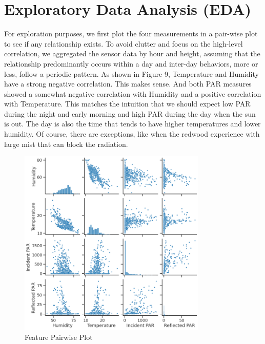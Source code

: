 \documentclass[11pt, letterpaper]{article}
\begin{document}
\section{Exploratory Data Analysis (EDA)}
For exploration purposes, we first plot the four measurements in a pair-wise plot to see if any relationship exists. To avoid clutter and focus on the high-level correlation, we aggregated the sensor data by hour and height, assuming that the relationship predominantly occurs within a day and inter-day behaviors, more or less, follow a periodic pattern. As shown in Figure 9, Temperature and Humidity have a strong negative correlation. This makes sense. And both PAR measures showed a somewhat negative correlation with Humidity and a positive correlation with Temperature. This matches the intuition that we should expect low PAR during the night and early morning and high PAR during the day when the sun is out. The day is also the time that tends to have higher temperatures and lower humidity. Of course, there are exceptions, like when the redwood experience with large mist that can block the radiation.
\begin{figure}[h!]
\centering
\includegraphics[width=0.8\textwidth]{eda_3.1.png}
\captionsetup{justification=centering}
\caption{Feature Pairwise Plot}
\end{figure}
\end{document}
